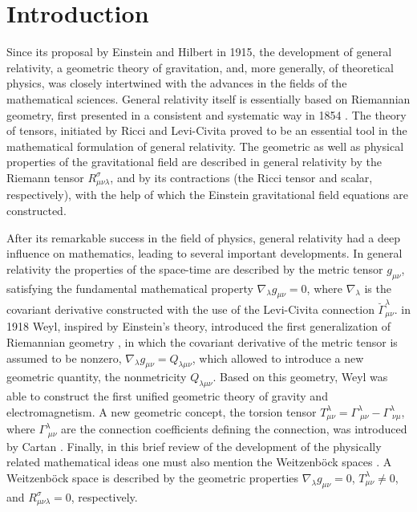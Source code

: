 \documentclass[aps,superscriptaddress, showpacs,preprintnumbers, superscriptaddress, nofootinbibt,twocolumn]{revtex4}
\begin{document}
\section{Introduction}

Since its proposal by Einstein \cite{Eina} and Hilbert \cite{Hil} in 1915, the development of general relativity, a geometric theory of gravitation, and, more generally, of theoretical physics, was closely intertwined with the advances in the fields of the mathematical sciences. General relativity itself is essentially based on Riemannian geometry, first presented in a consistent and systematic way in 1854 \cite{Riem}. The theory of tensors, initiated by Ricci and Levi-Civita \cite{Ric} proved to be an essential tool in the mathematical formulation of general relativity. The geometric as well as physical properties of the gravitational field are described in general relativity by the Riemann tensor $R_{\mu \nu \lambda}^{\sigma}$, and by its contractions (the Ricci tensor and scalar, respectively), with the help of which the Einstein gravitational field equations are constructed.

After its remarkable success in the field of physics, general relativity had a deep influence on mathematics, leading to several important developments. In general relativity the properties of the space-time are described by the metric tensor $g_{\mu\nu}$, satisfying the fundamental mathematical  property $\nabla _{\lambda}g_{\mu \nu}=0$, where $\nabla _{\lambda}$ is the covariant derivative constructed with the use of the Levi-Civita connection $\breve{\Gamma}_{\mu \nu}^{\lambda}$.  in 1918 Weyl, inspired by Einstein's theory,  introduced the first generalization of Riemannian geometry \cite{Weyl}, in which the covariant derivative of the metric tensor is assumed to be nonzero, $\nabla _{\lambda}g_{\mu \nu}=Q_{\lambda \mu \nu}$, which allowed to introduce a new geometric quantity, the nonmetricity $Q_{\lambda \mu \nu}$. Based on this geometry, Weyl was able to construct the first unified geometric theory of gravity and electromagnetism.  A new geometric concept, the torsion tensor $T_{\mu \nu}^{\lambda}=\Gamma _{\;\mu \nu}^{\lambda}-\Gamma_{\;\nu \mu}^{\lambda}$, where $\Gamma _{\;\mu \nu}^{\lambda}$  are the connection coefficients defining the connection, was introduced by Cartan \cite{Car1,Car2,Car3,Car4}. Finally, in this brief review of the development of the physically related mathematical ideas one must also mention the Weitzenb\"{o}ck spaces \cite{Weit}. A Weitzenb\"{o}ck space is described
by the geometric properties $\nabla_{\lambda}g_{\mu \nu} = 0$, $T_{\mu \nu}^{\lambda}\neq 0$, and $R_{\mu \nu \lambda}^{\sigma}=0$, respectively.
\end{document}
